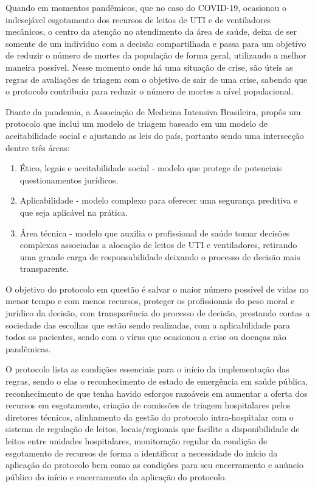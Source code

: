 \documentclass[12pt]{article}
\begin{document}
Quando em momentos pandêmicos, que no caso do COVID-19, ocasionou o indesejável esgotamento dos recursos de leitos de UTI e de ventiladores mecânicos, o centro da atenção no atendimento da área de saúde, deixa de ser somente de um indivíduo com a decisão compartilhada e passa para um objetivo de reduzir o número de mortes da população de forma geral, utilizando a melhor maneira possível. Nesse momento onde há uma situação de crise, são úteis as regras de avaliações de triagem com o objetivo de sair de uma crise, sabendo que o protocolo contribuiu para reduzir o número de mortes a nível populacional.

Diante da pandemia, a Associação de Medicina Intensiva Brasileira, propôs um protocolo que inclui um modelo de triagem baseado em um modelo de aceitabilidade social \cite{biddison2019too} e ajustando as leis do país, portanto sendo uma intersecção dentre três áreas: 
\begin{enumerate}
    \item  Ético, legais e aceitabilidade social - modelo que protege de potenciais questionamentos jurídicos.
    \item Aplicabilidade - modelo complexo para oferecer uma segurança preditiva e que seja aplicável na prática.
    \item Área técnica - modelo que auxilia o profissional de saúde tomar decisões complexas associadas a alocação de leitos de UTI e ventiladores, retirando uma grande carga de responsabilidade deixando o processo de decisão mais transparente.
\end{enumerate}

O objetivo do protocolo em questão é salvar o maior número possível de vidas no menor tempo e com menos recursos, proteger os profissionais do peso moral e jurídico da decisão, com transparência do processo de decisão, prestando contas a sociedade das escolhas que estão sendo realizadas, com a aplicabilidade para todos os pacientes, sendo com o vírus que ocasionou a crise ou doenças não pandêmicas.

O protocolo lista as condições essenciais para o início da implementação das regras, sendo o elas o reconhecimento de estado de emergência em saúde pública, reconhecimento de que tenha havido esforços razoáveis em aumentar a oferta dos recursos em esgotamento, criação de comissões de triagem hospitalares pelos diretores técnicos, alinhamento da gestão do protocolo intra-hospitalar com o sistema de regulação de leitos, locais/regionais que facilite a disponibilidade de leitos entre unidades hospitalares, monitoração regular da condição de esgotamento de recursos de forma a identificar a necessidade do início da aplicação do protocolo bem como as condições para seu encerramento e anúncio público do início e encerramento da aplicação do protocolo.
\end{document}
